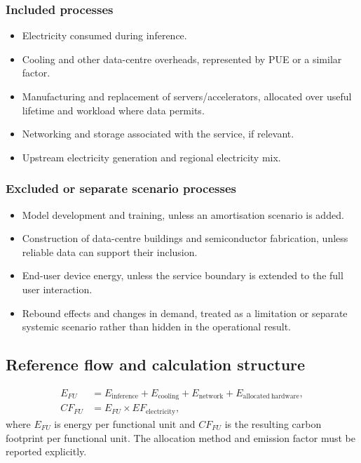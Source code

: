 \documentclass[11pt,a4paper]{article}
\begin{document}
\subsubsection{Included processes}
\begin{itemize}[leftmargin=*]
    \item Electricity consumed during inference.
    \item Cooling and other data-centre overheads, represented by PUE or a similar
    factor.
    \item Manufacturing and replacement of servers/accelerators, allocated over
    useful lifetime and workload where data permits.
    \item Networking and storage associated with the service, if relevant.
    \item Upstream electricity generation and regional electricity mix.
\end{itemize}

\subsubsection{Excluded or separate scenario processes}
\begin{itemize}[leftmargin=*]
    \item Model development and training, unless an amortisation scenario is
    added.
    \item Construction of data-centre buildings and semiconductor fabrication,
    unless reliable data can support their inclusion.
    \item End-user device energy, unless the service boundary is extended to the
    full user interaction.
    \item Rebound effects and changes in demand, treated as a limitation or
    separate systemic scenario rather than hidden in the operational result.
\end{itemize}

\subsection{Reference flow and calculation structure}
\begin{align}
    E_{FU} &= E_{\mathrm{inference}} + E_{\mathrm{cooling}} +
    E_{\mathrm{network}} + E_{\mathrm{allocated\ hardware}}, \\
    CF_{FU} &= E_{FU} \times EF_{\mathrm{electricity}},
\end{align}
where $E_{FU}$ is energy per functional unit and $CF_{FU}$ is the resulting
carbon footprint per functional unit. The allocation method and emission factor
must be reported explicitly.
\end{document}
